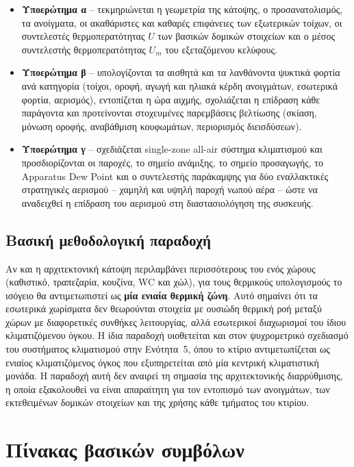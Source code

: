 \documentclass[12pt,a4paper]{article}
\begin{document}
\begin{itemize}
\item \textbf{Υποερώτημα α} -- τεκμηριώνεται η γεωμετρία της κάτοψης, ο
προσανατολισμός, τα ανοίγματα, οι ακαθάριστες και καθαρές επιφάνειες των
εξωτερικών τοίχων, οι συντελεστές θερμοπερατότητας \(U\) των βασικών δομικών
στοιχείων και ο μέσος συντελεστής θερμοπερατότητας \(U_m\) του εξεταζόμενου
κελύφους.
\item \textbf{Υποερώτημα β} -- υπολογίζονται τα αισθητά και τα λανθάνοντα
ψυκτικά φορτία ανά κατηγορία (τοίχοι, οροφή, αγωγή και ηλιακά κέρδη
ανοιγμάτων, εσωτερικά φορτία, αερισμός), εντοπίζεται η ώρα αιχμής,
σχολιάζεται η επίδραση κάθε παράγοντα και προτείνονται στοχευμένες παρεμβάσεις
βελτίωσης (σκίαση, μόνωση οροφής, αναβάθμιση κουφωμάτων, περιορισμός
διεισδύσεων).
\item \textbf{Υποερώτημα γ} -- σχεδιάζεται \textenglish{single-zone all-air}
σύστημα κλιματισμού και προσδιορίζονται οι παροχές, το σημείο ανάμιξης, το
σημείο προσαγωγής, το \textenglish{Apparatus Dew Point} και ο συντελεστής
παράκαμψης για δύο εναλλακτικές στρατηγικές αερισμού -- χαμηλή και υψηλή
παροχή νωπού αέρα -- ώστε να αναδειχθεί η επίδραση του αερισμού στη
διαστασιολόγηση της συσκευής.
\end{itemize}

\subsection{Βασική μεθοδολογική παραδοχή}

Αν και η αρχιτεκτονική κάτοψη περιλαμβάνει περισσότερους του ενός χώρους
(καθιστικό, τραπεζαρία, κουζίνα, WC και χώλ), για τους θερμικούς υπολογισμούς το
ισόγειο θα αντιμετωπιστεί ως \textbf{μία ενιαία θερμική ζώνη}. Αυτό σημαίνει ότι τα
εσωτερικά χωρίσματα δεν θεωρούνται στοιχεία με ουσιώδη θερμική ροή μεταξύ χώρων με
διαφορετικές συνθήκες λειτουργίας, αλλά εσωτερικοί διαχωρισμοί του ίδιου
κλιματιζόμενου όγκου. Η ίδια παραδοχή υιοθετείται και στον ψυχρομετρικό σχεδιασμό
του συστήματος κλιματισμού στην Ενότητα~5, όπου το κτίριο αντιμετωπίζεται ως
ενιαίος κλιματιζόμενος όγκος που εξυπηρετείται από μία κεντρική κλιματιστική
μονάδα. Η παραδοχή αυτή δεν αναιρεί τη σημασία της αρχιτεκτονικής διαρρύθμισης, η
οποία εξακολουθεί να είναι απαραίτητη για τον εντοπισμό των ανοιγμάτων, των
εκτεθειμένων δομικών στοιχείων και της χρήσης κάθε τμήματος του κτιρίου.

\section{Πίνακας βασικών συμβόλων}
\end{document}
